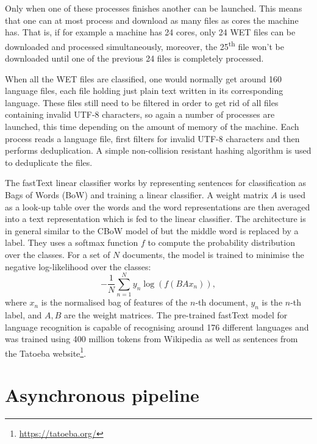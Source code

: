 Only when one of these processes finishes another can be launched. This means that one can at most process and download as many files as cores the machine has. That is, if for example a machine has 24 cores, only 24 WET files can be downloaded and processed simultaneously, moreover, the 25\textsuperscript{th} file won't be downloaded until one of the previous 24 files is completely processed.

When all the WET files are classified, one would normally get around 160 language files, each file holding just plain text written in its corresponding language. These files still need to be filtered in order to get rid of all files containing invalid UTF-8 characters, so again a number of processes are launched, this time depending on the amount of memory of the machine. Each process reads a language file, first filters for invalid UTF-8 characters and then performs deduplication. A simple non-collision resistant hashing algorithm is used to deduplicate the files.

The fastText linear classifier works by representing sentences for classification as Bags of Words (BoW) and training a linear classifier. A weight matrix $A$ is used as a look-up table over the words and the word representations are then averaged into a text representation which is fed to the linear classifier. The architecture is in general similar to the CBoW model of \citet{mikolov-etal-2013-distributed} but the middle word is replaced by a label. They uses a softmax function $f$ to compute the probability distribution over the classes. For a set of $N$ documents, the model is trained to minimise the negative log-likelihood over the classes:
\[
    -\frac{1}{N}\sum_{n=1}^{N} y_n\log\left(f(BAx_n)\right),
\]
where $x_n$ is the normalised bag of features of the $n$-th document, $y_n$ is the $n$-th label, and $A,B$ are the weight matrices. The pre-trained fastText model for language recognition \citep{Grave:2018} is capable of recognising around 176 different languages and was trained using 400 million tokens from Wikipedia as well as sentences from the Tatoeba website\footnote{\url{https://tatoeba.org/}}.

\section{Asynchronous pipeline}

